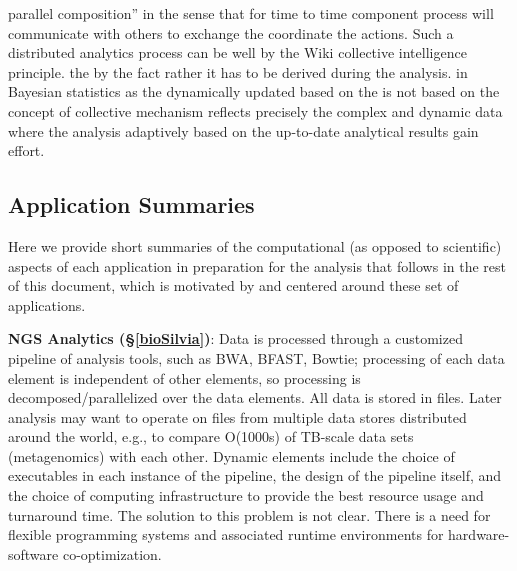 \documentclass[times]{cpeauth}
\begin{document}
parallel composition'' in the sense that for time to time %
component process will communicate with others to exchange the %
coordinate the actions. Such a distributed analytics process can be %
well by the Wiki collective intelligence principle.
%
the %
by the fact %
rather it has to be %
derived during the analysis.  %
in Bayesian statistics as the %
dynamically updated based on the %
is not based on the concept of %
collective mechanism reflects precisely the %
complex and dynamic data where the analysis %
adaptively based on the up-to-date analytical results gain %
effort.



\subsection{Application Summaries}

Here we provide short summaries of the computational (as opposed to scientific)
aspects of each application in preparation for the analysis that follows in the
rest of this document, which is motivated by and centered around these set of
applications.

{\bf NGS Analytics (\S\ref{bioSilvia})}: Data is processed through a customized
pipeline of analysis tools, such as BWA, BFAST, Bowtie; processing of each data
element is independent of other elements, so processing is
decomposed/parallelized over the data elements.  All data is stored in files.
Later analysis may want to operate on files from multiple data stores
distributed around the world, e.g., to compare O(1000s) of TB-scale data sets
(metagenomics) with each other.  Dynamic elements include the choice of
executables in each instance of the pipeline, the design of the pipeline itself,
and the choice of computing infrastructure to provide the best resource usage
and turnaround time.  The solution to this problem is not clear.  There is a
need for flexible programming systems and associated runtime environments for
hardware-software co-optimization.
\end{document}
